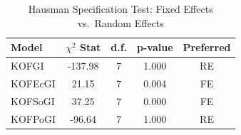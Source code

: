 \begin{table}
\caption{Hausman Specification Test: Fixed Effects vs.\ Random Effects}
\label{tab:hausman}
\begin{tabular}{lcccc}
\toprule
Model & $\chi^2$ Stat & d.f. & p-value & Preferred \\
\midrule
KOFGI & -137.98 & 7 & 1.000 & RE \\
KOFEcGI & 21.15 & 7 & 0.004 & FE \\
KOFSoGI & 37.25 & 7 & 0.000 & FE \\
KOFPoGI & -96.64 & 7 & 1.000 & RE \\
\bottomrule
\end{tabular}
\end{table}
